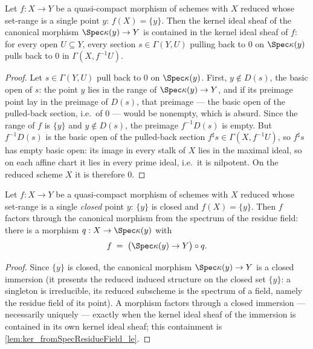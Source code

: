\begin{lemma}
  \label{lem:ker_fromSpecResidueField_le}
  \leanok
  Let \(f : X \to Y\) be a quasi-compact morphism of schemes with \(X\) reduced whose
  set-range is a single point \(y\): \(f(X) = \{y\}\). Then the kernel ideal sheaf of
  the canonical morphism \(\Spec \kappa(y) \to Y\) is contained in the kernel ideal
  sheaf of \(f\): for every open \(U \subseteq Y\), every section \(s \in \Gamma(Y, U)\)
  pulling back to \(0\) on \(\Spec \kappa(y)\) pulls back to \(0\) in
  \(\Gamma(X, f^{-1}U)\).
\end{lemma}
\begin{proof}
  \leanok
  Let \(s \in \Gamma(Y, U)\) pull back to \(0\) on \(\Spec \kappa(y)\). First,
  \(y \notin D(s)\), the basic open of \(s\): the point \(y\) lies in the range of
  \(\Spec \kappa(y) \to Y\), and if its preimage point lay in the preimage of \(D(s)\),
  that preimage --- the basic open of the pulled-back section, i.e.\ of \(0\) --- would
  be nonempty, which is absurd. Since the range of \(f\) is \(\{y\}\) and \(y \notin
  D(s)\), the preimage \(f^{-1}D(s)\) is empty. But \(f^{-1}D(s)\) is the basic open of
  the pulled-back section \(f^{\sharp}s \in \Gamma(X, f^{-1}U)\), so \(f^{\sharp}s\)
  has empty basic open: its image in every stalk of \(X\) lies in the maximal ideal, so
  on each affine chart it lies in every prime ideal, i.e.\ it is nilpotent. On the
  reduced scheme \(X\) it is therefore \(0\).
\end{proof}

\begin{theorem}
  \label{thm:hom_factors_fromSpecResidueField}
  \leanok
  Let \(f : X \to Y\) be a quasi-compact morphism of schemes with \(X\) reduced whose
  set-range is a single \emph{closed} point \(y\): \(\{y\}\) is closed and
  \(f(X) = \{y\}\). Then \(f\) factors through the canonical morphism from the spectrum
  of the residue field: there is a morphism \(q : X \to \Spec \kappa(y)\) with
  \[
    f \;=\; \bigl(\Spec \kappa(y) \to Y\bigr) \circ q .
  \]
\end{theorem}
\begin{proof}
  \leanok
  Since \(\{y\}\) is closed, the canonical morphism \(\Spec \kappa(y) \to Y\) is a
  closed immersion (it presents the reduced induced structure on the closed set
  \(\{y\}\): a singleton is irreducible, its reduced subscheme is the spectrum of a
  field, namely the residue field of its point). A morphism factors through a closed
  immersion --- necessarily uniquely --- exactly when the kernel ideal sheaf of the
  immersion is contained in its own kernel ideal sheaf; this containment is
  \ref{lem:ker_fromSpecResidueField_le}.
\end{proof}


